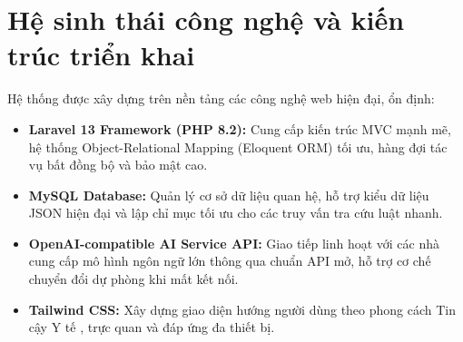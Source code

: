 \section{Hệ sinh thái công nghệ và kiến trúc triển khai}

Hệ thống được xây dựng trên nền tảng các công nghệ web hiện đại, ổn định:
\begin{itemize}[leftmargin=1.6em, itemsep=2pt]
  \item \textbf{Laravel 13 Framework (PHP 8.2):} Cung cấp kiến trúc MVC mạnh mẽ,
        hệ thống Object-Relational Mapping (Eloquent ORM) tối ưu, hàng đợi tác
        vụ bất đồng bộ  và bảo mật cao.
  \item \textbf{MySQL Database:} Quản lý cơ sở dữ liệu quan hệ, hỗ trợ kiểu dữ liệu
        JSON hiện đại và lập chỉ mục tối ưu cho các truy vấn tra cứu luật nhanh.
  \item \textbf{OpenAI-compatible AI Service API:} Giao tiếp linh hoạt với các
        nhà cung cấp mô hình ngôn ngữ lớn thông qua chuẩn API mở, hỗ trợ cơ chế
        chuyển đổi dự phòng  khi mất kết nối.
  \item \textbf{Tailwind CSS:} Xây dựng giao diện hướng người dùng theo phong cách
        Tin cậy Y tế , trực quan và đáp ứng đa thiết bị.
\end{itemize}
